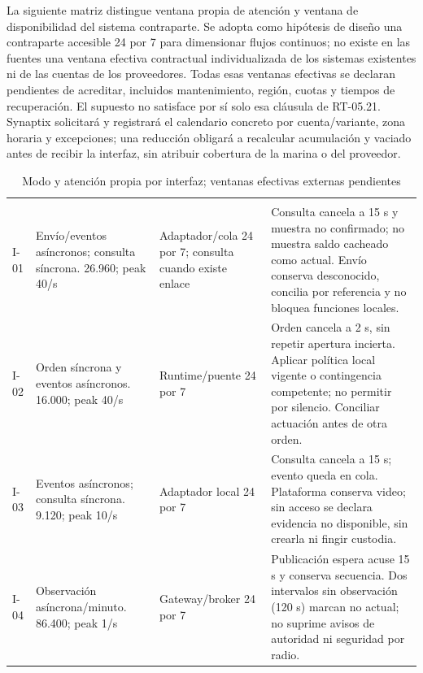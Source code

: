 La siguiente matriz distingue ventana propia de atención y ventana de disponibilidad del sistema contraparte. Se adopta como hipótesis de diseño una contraparte accesible 24 por 7 para dimensionar flujos continuos; no existe en las fuentes una ventana efectiva contractual individualizada de los sistemas existentes ni de las cuentas de los proveedores. Todas esas ventanas efectivas se declaran pendientes de acreditar, incluidos mantenimiento, región, cuotas y tiempos de recuperación. El supuesto no satisface por sí solo esa cláusula de RT-05.21. Synaptix solicitará y registrará el calendario concreto por cuenta/variante, zona horaria y excepciones; una reducción obligará a recalcular acumulación y vaciado antes de recibir la interfaz, sin atribuir cobertura de la marina o del proveedor.

\begin{longtable}{@{}L{.11\linewidth}L{.26\linewidth}L{.22\linewidth}L{\dimexpr.41\tabcolsep\relax}@{}}
\caption{Modo y atención propia por interfaz; ventanas efectivas externas pendientes}\label{tab:a42-ventanas}\\
\hline
{} &  &  & \\ \hline
\endfirsthead
\hline
{} &  &  & \\ \hline
\endhead
I-01 & Envío/eventos asíncronos; consulta síncrona. 26.960; peak 40/s & Adaptador/cola 24 por 7; consulta cuando existe enlace & Consulta cancela a 15 s y muestra no confirmado; no muestra saldo cacheado como actual. Envío conserva desconocido, concilia por referencia y no bloquea funciones locales.\\ \hline
I-02 & Orden síncrona y eventos asíncronos. 16.000; peak 40/s & Runtime/puente 24 por 7 & Orden cancela a 2 s, sin repetir apertura incierta. Aplicar política local vigente o contingencia competente; no permitir por silencio. Conciliar actuación antes de otra orden.\\ \hline
I-03 & Eventos asíncronos; consulta síncrona. 9.120; peak 10/s & Adaptador local 24 por 7 & Consulta cancela a 15 s; evento queda en cola. Plataforma conserva video; sin acceso se declara evidencia no disponible, sin crearla ni fingir custodia.\\ \hline
I-04 & Observación asíncrona/minuto. 86.400; peak 1/s & Gateway/broker 24 por 7 & Publicación espera acuse 15 s y conserva secuencia. Dos intervalos sin observación (120 s) marcan no actual; no suprime avisos de autoridad ni seguridad por radio.\\ \hline

\end{longtable}
